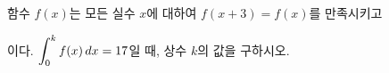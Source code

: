함수 $f(x)$는 모든 실수 $x$에 대하여 $f(x+3)=f(x)$를 만족시키고\par\smallskip{}\par\smallskip\noindent 이다. $\displaystyle\int_{0}^{k} f(x)\mkern3mu dx=17$일 때, 상수 $k$의 값을 구하시오.
